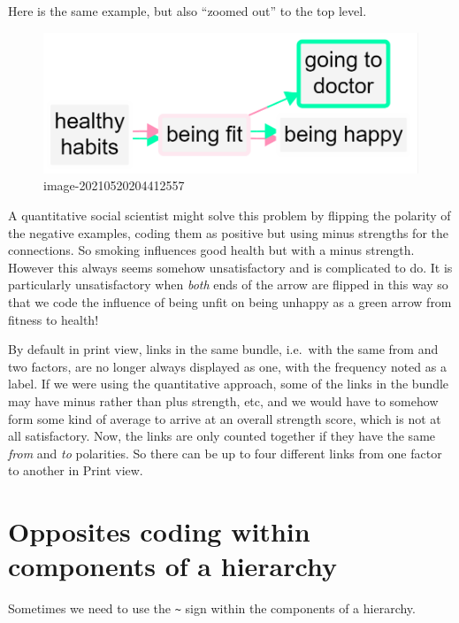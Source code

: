 \documentclass[
]{book}
\begin{document}
Here is the same example, but also ``zoomed out'' to the top level.

\begin{figure}
\centering
\includegraphics[width=6.77083in,height=\textheight]{_assets/image-20210520204412557.png}
\caption{image-20210520204412557}
\end{figure}

A quantitative social scientist might solve this problem by flipping the polarity of the negative examples, coding them as positive but using minus strengths for the connections. So smoking influences good health but with a minus strength. However this always seems somehow unsatisfactory and is complicated to do. It is particularly unsatisfactory when \emph{both} ends of the arrow are flipped in this way so that we code the influence of being unfit on being unhappy as a green arrow from fitness to health!

By default in print view, links in the same bundle, i.e.~with the same from and two factors, are no longer always displayed as one, with the frequency noted as a label. If we were using the quantitative approach, some of the links in the bundle may have minus rather than plus strength, etc, and we would have to somehow form some kind of average to arrive at an overall strength score, which is not at all satisfactory. Now, the links are only counted together if they have the same \emph{from} and \emph{to} polarities. So there can be up to four different links from one factor to another in Print view.

\hypertarget{opposites-coding-within-components-of-a-hierarchy}{%
\section{Opposites coding within components of a hierarchy}\label{opposites-coding-within-components-of-a-hierarchy}}

Sometimes we need to use the \texttt{\textasciitilde{}} sign within the components of a hierarchy.
\end{document}
